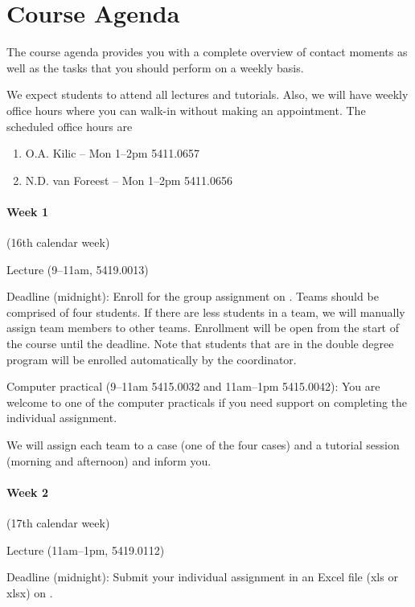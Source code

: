 \documentclass{article}
\begin{document}
\section{Course Agenda}
\label{sec:agenda}

The course agenda provides you with a complete overview of contact moments as well as the tasks that you should perform on a weekly basis. 

We expect students to attend all lectures and tutorials. Also, we will have weekly office hours where you can walk-in without making an appointment. The scheduled office hours are 
\begin{enumerate}
\item O.A. Kilic -- Mon 1--2pm 5411.0657
\item N.D. van Foreest -- Mon 1--2pm 5411.0656
\end{enumerate}

\vspace{.5cm}
\paragraph{Week 1} {\footnotesize (16th calendar week)}
\begin{description}[font=\normalfont\itshape,leftmargin=!,labelwidth=2cm]
\item[Tue 18/4] Lecture (9--11am, 5419.0013)
\item[Thu 20/4] Deadline (midnight): Enroll for the group assignment on \nestor. Teams should be comprised of four students. If there are less students in a team, we will manually assign team members to other teams. Enrollment will be open from the start of the course until the deadline. Note that students that are in the double degree program will be enrolled automatically by the coordinator. 
\item[Fri 21/04] Computer practical (9--11am 5415.0032 and 11am--1pm 5415.0042): You are welcome to one of the computer practicals if you need support on completing the individual assignment.
\item[Fri 21/04] We will assign each team to a case (one of the four cases) and a tutorial session (morning and afternoon) and inform you.
\end{description}

\paragraph{Week 2} {\footnotesize (17th calendar week)}
\begin{description}[font=\normalfont\itshape,leftmargin=!,labelwidth=2cm]
\item[Mon 24/4] Lecture (11am--1pm, 5419.0112)
\item[Wed 26/4] Deadline (midnight): Submit your individual assignment in an Excel file (xls or xlsx) on \nestor. 
\end{description}
\end{document}
